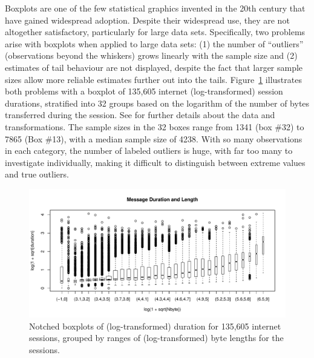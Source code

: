 \documentclass[12pt,oneside]{article}
\begin{document}
Boxplots are one of the few statistical graphics invented in the 20th century
that have gained widespread adoption. Despite their widespread use, they are
not altogether satisfactory, particularly for large data sets. Specifically,
two problems arise with boxplots when applied to large data sets: (1) the
number of ``outliers'' (observations beyond the whiskers) grows linearly with
the sample size and (2) estimates of tail behaviour are not displayed, despite
the fact that larger sample sizes allow more reliable estimates further out
into the tails. Figure~\ref{fig:internet-bp} illustrates both problems with a
boxplot of 135,605 internet (log-transformed) session durations, stratified
into 32 groups based on the logarithm of the number of bytes transferred
during the session. See \citet{kw06} for further details about the data and
transformations. The sample sizes in the 32 boxes range from 1341 (box \#32)
to 7865 (Box \#13), with a median sample size of 4238. With so many
observations in each category, the number of labeled outliers is huge, with
far too many to investigate individually, making it difficult to distinguish
between extreme values and true outliers.

\begin{figure}[hbtp]
  \centering
  \includegraphics[width=\linewidth]{box2}

  \caption{Notched boxplots \citep{variations.boxplots} of (log-transformed)
  duration for 135,605 internet sessions, grouped by ranges of
  (log-transformed) byte lengths for the sessions.}

  \label{fig:internet-bp} 
\end{figure}
\end{document}
